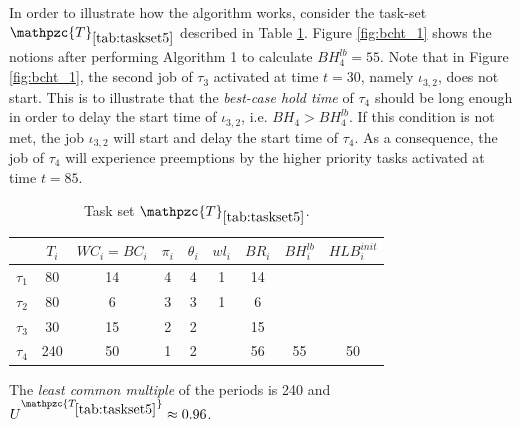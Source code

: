 \documentclass[fleqn]{article}
\begin{document}

In order to illustrate how the algorithm works, consider the task-set $\mathpzc{T}_{\ref{tab:taskset5}}$ described in Table \ref{tab:taskset5}. Figure \ref{fig:bcht_1} shows the notions after performing Algorithm 1 to calculate $BH^{lb}_4=55$. Note that in Figure \ref{fig:bcht_1}, the second job of $\tau_3$ activated at time $t=30$, namely $\iota_{3,2}$, does not start. This is to illustrate that the \textit{best-case hold time} of $\tau_4$ should be long enough in order to delay the start time of $\iota_{3,2}$, i.e. $BH_4 > BH^{lb}_4$. If this condition is not met, the job $\iota_{3,2}$ will start and delay the start time of $\tau_4$. As a consequence, the job of $\tau_4$ will experience preemptions by the higher priority tasks activated at time $t=85$.

\begin{table}[H]
	\center
	\caption{Task set $\mathpzc{T}_{\ref{tab:taskset5}}$.}
	\label{tab:taskset5}
	\begin{tabular}{c c c c c | c c c c}
		\hline 
		& $T_i$ & $WC_i=BC_i$ & $\pi_i$ & $\theta_i$ &  $wl_i$ & $BR_i$ & $BH^{lb}_i$ & $HLB^{init}_i$\\ 
		\hline 
		$\tau_1$& 80  & 14  & 4 & 4 &  1 & 14 & &\\
		$\tau_2$& 80  & 6   & 3 & 3 &  1 & 6  & &\\ 
		$\tau_3$& 30  & 15  & 2 & 2 &   & 15  & &\\ 
		$\tau_4$& 240 & 50  & 1 & 2 &   & 56  & 55& 50\\
		\hline 
	\end{tabular}
	\small
	\item The \textit{least common multiple} of the periods is 240 and $U^{\mathpzc{T_{\ref{tab:taskset5}}}} \approx 0.96$.
\end{table}
\end{document}

